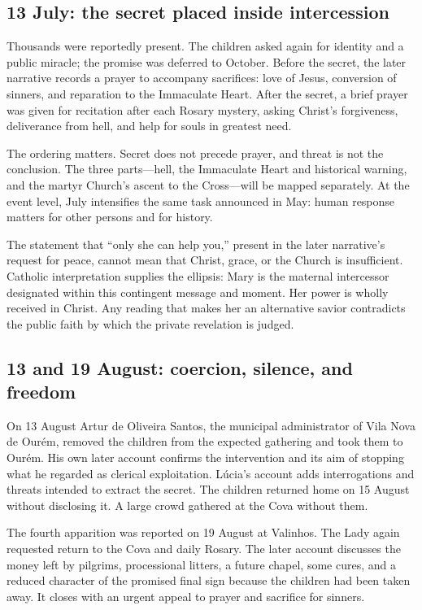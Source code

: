 \subsection{13 July: the secret placed inside intercession}

Thousands were reportedly present. The children asked again for identity and a public miracle; the promise was deferred to October. Before the secret, the later narrative records a prayer to accompany sacrifices: love of Jesus, conversion of sinners, and reparation to the Immaculate Heart. After the secret, a brief prayer was given for recitation after each Rosary mystery, asking Christ's forgiveness, deliverance from hell, and help for souls in greatest need.

The ordering matters. Secret does not precede prayer, and threat is not the conclusion. The three parts---hell, the Immaculate Heart and historical warning, and the martyr Church's ascent to the Cross---will be mapped separately. At the event level, July intensifies the same task announced in May: human response matters for other persons and for history.

The statement that “only she can help you,” present in the later narrative's request for peace, cannot mean that Christ, grace, or the Church is insufficient. Catholic interpretation supplies the ellipsis: Mary is the maternal intercessor designated within this contingent message and moment. Her power is wholly received in Christ. Any reading that makes her an alternative savior contradicts the public faith by which the private revelation is judged.

\subsection{13 and 19 August: coercion, silence, and freedom}

On 13 August Artur de Oliveira Santos, the municipal administrator of Vila Nova de Ourém, removed the children from the expected gathering and took them to Ourém. His own later account confirms the intervention and its aim of stopping what he regarded as clerical exploitation. Lúcia's account adds interrogations and threats intended to extract the secret. The children returned home on 15 August without disclosing it. A large crowd gathered at the Cova without them.

The fourth apparition was reported on 19 August at Valinhos. The Lady again requested return to the Cova and daily Rosary. The later account discusses the money left by pilgrims, processional litters, a future chapel, some cures, and a reduced character of the promised final sign because the children had been taken away. It closes with an urgent appeal to prayer and sacrifice for sinners.

